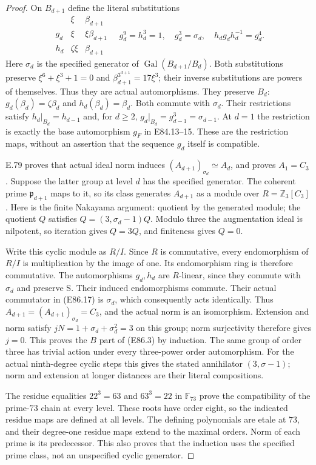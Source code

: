 \begin{proof}
On $B_{d+1}$ define the literal substitutions
\[
 \begin{array}{c|cc}
      &\xi&\beta_{d+1}\\ \hline
 g_d&\xi&\xi\beta_{d+1}\\
 h_d&\zeta\xi&\beta_{d+1}
 \end{array}
 \quad
 g_d^9=h_d^3=1,\quad g_d^3=\sigma_d,\quad
 h_dg_dh_d^{-1}=g_d^4.
 \tag{E86.17}
\]
Here $\sigma_d$ is the specified generator of
$\operatorname{Gal}(B_{d+1}/B_d)$.
Both substitutions preserve $\xi^6+\xi^3+1=0$
and $\beta_{d+1}^{3^{d+1}}=17\xi^3$;
their inverse substitutions are powers of
themselves. Thus they are actual automorphisms.
They preserve $B_d$: $g_d(\beta_d)=\zeta\beta_d$
and $h_d(\beta_d)=\beta_d$. Both commute with
$\sigma_d$. Their restrictions satisfy
$h_d|_{B_d}=h_{d-1}$ and, for $d\ge2$,
$g_d|_{B_d}=g_{d-1}^3=\sigma_{d-1}$.
At $d=1$ the restriction is exactly the base
automorphism $g_F$ in E84.13--15. These are the
restriction maps, without an assertion that the
sequence $g_d$ itself is compatible.

E.79 proves that actual ideal norm induces
$(A_{d+1})_{\sigma_d}\simeq A_d$, and proves
$A_1=C_3$. Suppose the latter group at level $d$
has the specified generator. The coherent prime
$\mathfrak p_{d+1}$ maps to it, so its class
generates $A_{d+1}$ as a module over
$R=\mathbb Z_3[C_3]$. Here is the finite
Nakayama argument: quotient by the generated
module; the quotient $Q$ satisfies
$Q=(3,\sigma_d-1)Q$. Modulo three the augmentation
ideal is nilpotent, so iteration gives $Q=3Q$,
and finiteness gives $Q=0$.

Write this cyclic module as $R/I$. Since $R$ is
commutative, every endomorphism of $R/I$ is
multiplication by the image of one. Its endomorphism
ring is therefore commutative. The automorphisms
$g_d,h_d$ are $R$-linear, since they commute with
$\sigma_d$ and preserve S. Their induced
endomorphisms commute. Their actual commutator
in (E86.17) is $\sigma_d$, which consequently
acts identically. Thus $A_{d+1}=(A_{d+1})_{\sigma_d}
=C_3$, and the actual norm is an isomorphism.
Extension and norm satisfy
$jN=1+\sigma_d+\sigma_d^2=3$ on this group;
norm surjectivity therefore gives $j=0$.
This proves the $B$ part of (E86.3) by induction.
The same group of order three has trivial action
under every three-power order automorphism.
For the actual ninth-degree cyclic steps this
gives the stated annihilator $(3,\sigma-1)$;
norm and extension at longer distances are their
literal compositions.

The residue equalities $22^3=63$ and $63^3=22$
in $\mathbb F_{73}$ prove the compatibility of
the prime-$73$ chain at every level. These roots
have order eight, so the indicated residue maps
are defined at all levels. The defining polynomials
are etale at $73$, and their degree-one residue
maps extend to the maximal orders. Norm of each
prime is its predecessor. This also proves that
the induction uses the specified prime class,
not an unspecified cyclic generator.


\end{proof}
